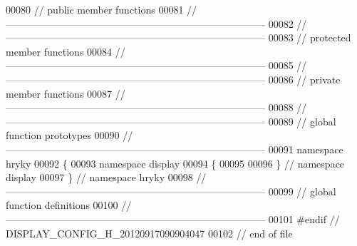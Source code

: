 \begin{DoxyCode}
00080 \textcolor{comment}{// public member functions}
00081 \textcolor{comment}{//
      ------------------------------------------------------------------------------}
00082 \textcolor{comment}{//
      ------------------------------------------------------------------------------}
00083 \textcolor{comment}{// protected member functions}
00084 \textcolor{comment}{//
      ------------------------------------------------------------------------------}
00085 \textcolor{comment}{//
      ------------------------------------------------------------------------------}
00086 \textcolor{comment}{// private member functions}
00087 \textcolor{comment}{//
      ------------------------------------------------------------------------------}
00088 \textcolor{comment}{//
      ------------------------------------------------------------------------------}
00089 \textcolor{comment}{// global function prototypes}
00090 \textcolor{comment}{//
      ------------------------------------------------------------------------------}
00091 \textcolor{keyword}{namespace }hryky
00092 \{
00093 \textcolor{keyword}{namespace }display
00094 \{
00095 
00096 \} \textcolor{comment}{// namespace display}
00097 \} \textcolor{comment}{// namespace hryky}
00098 \textcolor{comment}{//
      ------------------------------------------------------------------------------}
00099 \textcolor{comment}{// global function definitions}
00100 \textcolor{comment}{//
      ------------------------------------------------------------------------------}
00101 \textcolor{preprocessor}{#endif // DISPLAY\_CONFIG\_H\_20120917090904047}
00102 \textcolor{preprocessor}{}\textcolor{comment}{// end of file}
\end{DoxyCode}

